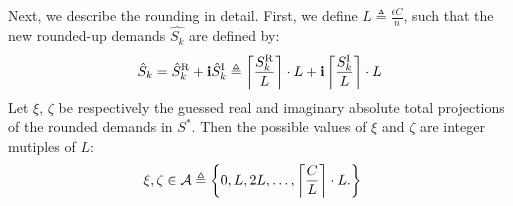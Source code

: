 Next, we describe the rounding in detail. First, we define
$L \triangleq \frac{\epsilon C}{n}$, such that the new rounded-up demands $\hat{S_k}$ are defined by:
\begin{equation}
\hat S_k =
\hat S_k^{\rm R} + {\bf i} \hat S_k^{\rm I} \triangleq  
\left\lceil \frac{S_k^{\rm R}}{L} \right\rceil \cdot L + {\bf i} \left\lceil \frac{S_k^{\rm I}}{L} \right\rceil \cdot L
\label{eq:truc}
\end{equation}
Let $\xi$, $\zeta$  be respectively the guessed real and imaginary absolute total projections of the rounded demands in $S^\ast$.
Then the possible values of $\xi$ and $\zeta$ are integer mutiples of $L$:
\begin{align}
\xi, \zeta  \in {\cal A} & \triangleq \left\{0, L, 2L,\ldots,\left\lceil \frac{C}{L} \right\rceil\cdot L.\right\}
\label{eq:grid}
\end{align}


